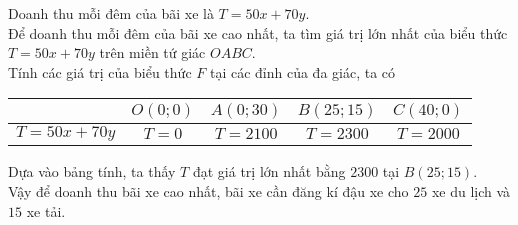 \begin{bt}
{{\begin{tikzpicture}[scale=1, font=\footnotesize, line join=round, line cap=round, >=stealth]
\end{tikzpicture}
}
	\noindent Doanh thu mỗi đêm của bãi xe là $T=50x+70y$.\\
	Để doanh thu mỗi đêm của bãi xe cao nhất, ta tìm giá trị lớn nhất của biểu thức $T=50x+70y$ trên miền tứ giác $OABC$.\\
	Tính các giá trị của biểu thức $F$ tại các đỉnh của đa giác, ta có
	\begin{center}
		\begin{longtable}{|c|c|c|c|c|}
			\hline
			& $O(0;0)$& $A(0;30)$& $B(25;15)$& $C(40;0)$\\
			\hline
			$T=50x+70y$& $T=0$ & $T=2100$ &$T=2300$ & $T=2000$
			\hline
		\end{longtable}
	\end{center}
	Dựa vào bảng tính, ta thấy $T$ đạt giá trị lớn nhất bằng $2300$ tại $B(25;15)$.\\
	Vậy để doanh thu bãi xe cao nhất, bãi xe cần đăng kí đậu xe cho $25$ xe du lịch và $15$ xe tải.
	
}
\end{bt}
